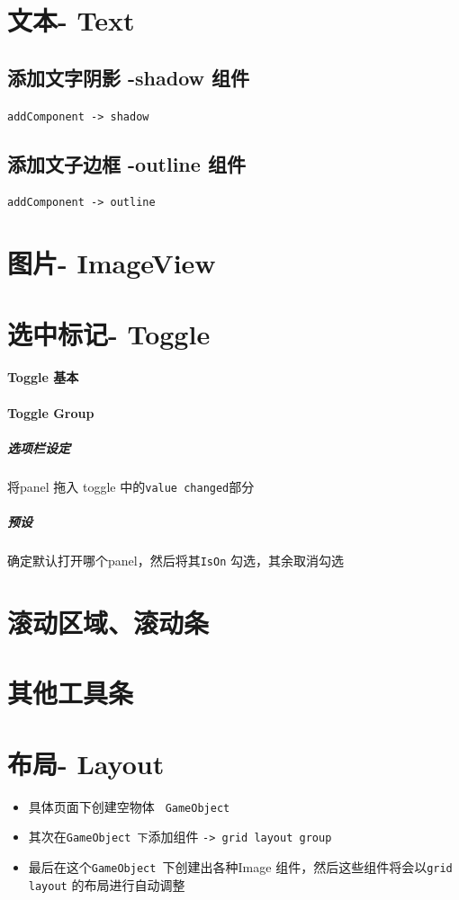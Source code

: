 \documentclass[UTF8,a4paper,12pt]{ctexbook}
\begin{document}
	\section{文本- Text}
		\subsection{添加文字阴影 -shadow 组件}
			\verb|addComponent -> shadow|
			
		\subsection{添加文子边框 -outline 组件}
			\verb|addComponent -> outline|
			
	\section{图片- ImageView}
		
	\section{选中标记- Toggle}
		\paragraph{Toggle 基本}
		
		\paragraph{Toggle Group}
			\subparagraph{选项栏设定}
				将panel  拖入 toggle 中的\verb|value changed|部分
				
			\subparagraph{预设}
				确定默认打开哪个panel，然后将其\verb|IsOn| 勾选，其余取消勾选	
				
	\section{滚动区域、滚动条}
	
	
	\section{其他工具条}
	
	\section{布局- Layout}
		\begin{itemize}
			\item 具体页面下创建空物体 \verb| GameObject|
			\item 其次在\verb|GameObject 下|添加组件 \verb|-> grid layout group|
			\item 最后在这个\verb|GameObject |下创建出各种Image 组件，然后这些组件将会以\verb|grid layout| 的布局进行自动调整
		\end{itemize}
	
\end{document}
